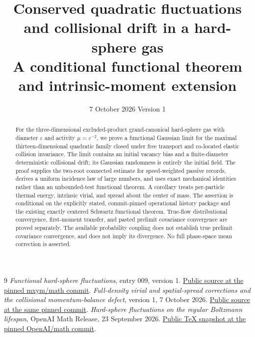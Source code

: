 \documentclass[11pt,letterpaper]{article}
\title{Conserved quadratic fluctuations and collisional drift
in a hard-sphere gas\\[0.5em]\large A conditional functional theorem and intrinsic-moment extension}
\author{}
\date{7 October 2026 \quad Version 1}
\numberwithin{equation}{section}
\theoremstyle{definition}\newtheorem{assumption}[theorem]{Assumption}
\theoremstyle{remark}\newtheorem{remark}[theorem]{Remark}
\newcommand{\eps}{\varepsilon}
\begin{document}
\maketitle
\begin{abstract}
For the three-dimensional excluded-product grand-canonical hard-sphere gas
with diameter $\eps$ and activity $\mu=\eps^{-2}$, we prove a functional
Gaussian limit for the maximal thirteen-dimensional quadratic family closed
under free transport and co-located elastic collision invariance. The limit
contains an initial vacancy bias and a finite-diameter deterministic
collisional drift; its Gaussian randomness is entirely the initial field.
The proof supplies the two-root connected estimate for speed-weighted passive
records, derives a uniform incidence law of large numbers, and uses exact
mechanical identities rather than an unbounded-test functional theorem.
A corollary treats per-particle thermal energy, intrinsic virial, and spread
about the center of mass. The assertion is conditional on the explicitly
stated, commit-pinned operational history package and the existing exactly
centered Schwartz functional theorem. True-flow distributional convergence,
first-moment transfer, and pasted prelimit covariance convergence are proved
separately. The available probability coupling does not establish true
prelimit covariance convergence, and does not imply its divergence. No
full phase-space mean correction is asserted.
\end{abstract}
\tableofcontents







\appendix

\noindent\begin{minipage}{\textwidth}
\begin{thebibliography}{9}
 \emph{Functional hard-sphere fluctuations}, entry 009, version 1.
\href{https://github.com/mxym/math/tree/87868bcb65bf0460a90d6bc2efc3324e46481230/preprints/009-functional-hard-sphere-fluctuations/v1}{Public source at the pinned mxym/math commit}.
 \emph{Full-density virial and spatial-spread corrections and the
collisional momentum-balance defect}, version 1, 7 October 2026.
\href{https://github.com/mxym/math/tree/87868bcb65bf0460a90d6bc2efc3324e46481230/notes/full-density-virial-stress}{Public source at the same pinned commit}.
 \emph{Hard-sphere fluctuations on the regular Boltzmann lifespan},
OpenAI Math Release, 23 September 2026.
\href{https://github.com/openai/math/tree/adc7f1241b42e322a6451854ab7e4b4c146bf78a/preprints/Hard-sphere-fluctuations-on-the-regular-Boltzmann-lifespan-September-23-2026/build}{Public TeX snapshot at the pinned OpenAI/math commit}.
\end{thebibliography}
\end{minipage}
\end{document}
